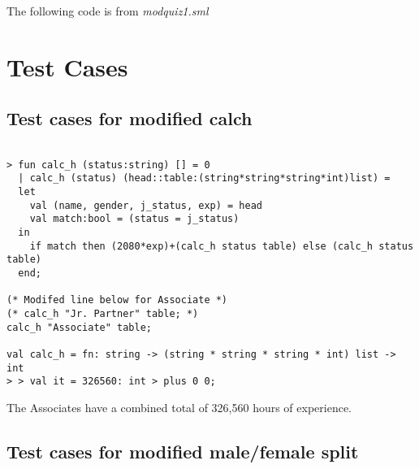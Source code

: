 \documentclass{report}
\begin{document}
The following code is from \emph{modquiz1.sml}


\section{Test Cases}
\label{sec:test-cases}

\subsection{Test cases for modified calch}
\label{sec:test-cases-modified}


\begin{session}
  \begin{scriptsize}
\begin{verbatim}

> fun calc_h (status:string) [] = 0
  | calc_h (status) (head::table:(string*string*string*int)list) =
  let
    val (name, gender, j_status, exp) = head
    val match:bool = (status = j_status)
  in
    if match then (2080*exp)+(calc_h status table) else (calc_h status table)
  end;

(* Modifed line below for Associate *)
(* calc_h "Jr. Partner" table; *)
calc_h "Associate" table;

val calc_h = fn: string -> (string * string * string * int) list -> int
> > val it = 326560: int > plus 0 0;

\end{verbatim}
  \end{scriptsize}
\end{session}

The Associates have a combined total of 326,560 hours of experience.

\subsection{Test cases for modified male/female split}
\label{sec:test-cases-modified-2}
\end{document}
